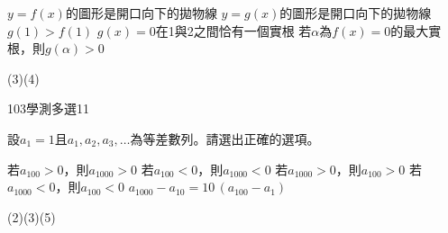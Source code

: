 \begin{QUESTIONS}
\begin{QUESTION}
\begin{QBODY}
		\begin{QOPS}
			\QOP $y=f(x)$的圖形是開口向下的拋物線
			\QOP $y=g(x)$的圖形是開口向下的拋物線
			\QOP $g(1)>f(1)$
			\QOP $g(x)=0$在1與2之間恰有一個實根
			\QOP 若$\alpha $為$f(x)=0$的最大實根，則$g(\alpha )>0$
		\end{QOPS}
        \end{QBODY}
        \begin{QFROMS}
        \end{QFROMS}
        \begin{QTAGS}\end{QTAGS}
        \begin{QANS}
            (3)(4)
        \end{QANS}
        \begin{QSOLLIST}
        \end{QSOLLIST}
        \begin{QEMPTYSPACE}
        \end{QEMPTYSPACE}
    \end{QUESTION}
    \begin{QUESTION}
        \begin{ExamInfo}{103}{學測}{多選}{11}
        \end{ExamInfo}
        \begin{ExamAnsRateInfo}{50}{80}{50}{20}
        \end{ExamAnsRateInfo}
        \begin{QBODY}
            設${{a}_{1}}=1$且${{a}_{1}},{{a}_{2}},{{a}_{3}},\ldots $為等差數列。請選出正確的選項。
			\begin{QOPS}
				\QOP 若${{a}_{100}}>0$，則${{a}_{1000}}>0$
				\QOP 若${{a}_{100}}<0$，則${{a}_{1000}}<0$
				\QOP 若${{a}_{1000}}>0$，則${{a}_{100}}>0$
				\QOP 若${{a}_{1000}}<0$，則${{a}_{100}}<0$
				\QOP ${{a}_{1000}}-{{a}_{10}}=10\,({{a}_{100}}-{{a}_{1}})$
			\end{QOPS}
        \end{QBODY}
        \begin{QFROMS}
        \end{QFROMS}
        \begin{QTAGS}\end{QTAGS}
        \begin{QANS}
            (2)(3)(5)
        \end{QANS}
        \begin{QSOLLIST}
        \end{QSOLLIST}

\end{QUESTION}
\end{QUESTIONS}
